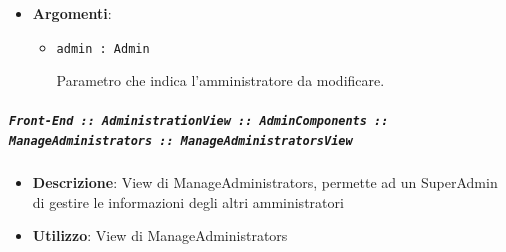 \documentclass[../DefinizioneDiProdotto.tex]{subfiles}
\begin{document}
\begin{itemize}
\begin{itemize}
\begin{itemize}
	\item \textbf{Argomenti}:
	\begin{itemize}
	\item \texttt{admin : Admin}\

	 Parametro che indica l'amministratore da modificare.
	\end{itemize}
	\end{itemize}\vspace{0.5em}
	\end{itemize}\subparagraph{\texttt{Front-End :: AdministrationView :: AdminComponents :: ManageAdministrators :: ManageAdministratorsView}}
	\begin{itemize}\item \textbf{Descrizione}: View di ManageAdministrators, permette ad un SuperAdmin di gestire le informazioni degli altri amministratori
	\item \textbf{Utilizzo}: View di ManageAdministrators
	\end{itemize}\end{itemize}

	\newpage
\end{document}
